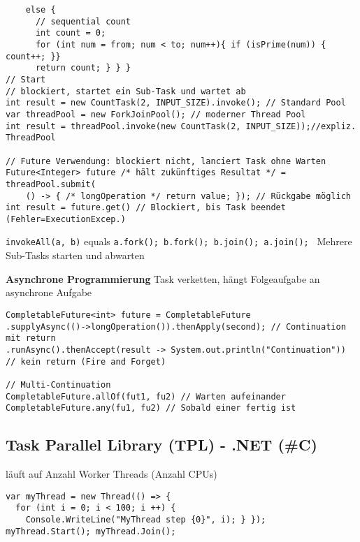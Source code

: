 \begin{lstlisting}
    else {
      // sequential count
      int count = 0;
      for (int num = from; num < to; num++){ if (isPrime(num)) { count++; }}
      return count; } } }
// Start
// blockiert, startet ein Sub-Task und wartet ab
int result = new CountTask(2, INPUT_SIZE).invoke(); // Standard Pool
var threadPool = new ForkJoinPool(); // moderner Thread Pool
int result = threadPool.invoke(new CountTask(2, INPUT_SIZE));//expliz. ThreadPool

// Future Verwendung: blockiert nicht, lanciert Task ohne Warten
Future<Integer> future /* hält zukünftiges Resultat */ = threadPool.submit(
    () -> { /* longOperation */ return value; }); // Rückgabe möglich
int result = future.get() // Blockiert, bis Task beendet (Fehler=ExecutionExcep.)
\end{lstlisting}

\lstinline{invokeAll(a, b)} equals \lstinline{a.fork(); b.fork(); b.join(); a.join(); } Mehrere Sub-Tasks starten und abwarten

\textbf{Asynchrone Programmierung}
Task verketten, hängt Folgeaufgabe an asynchrone Aufgabe
\begin{lstlisting}
CompletableFuture<int> future = CompletableFuture
.supplyAsync(()->longOperation()).thenApply(second); // Continuation mit return
.runAsync().thenAccept(result -> System.out.println("Continuation")) // kein return (Fire and Forget)

// Multi-Continuation
CompletableFuture.allOf(fut1, fu2) // Warten aufeinander
CompletableFuture.any(fu1, fu2) // Sobald einer fertig ist
\end{lstlisting}




\subsection{Task Parallel Library (TPL) - .NET (\#C)}
läuft auf Anzahl Worker Threads (Anzahl CPUs)

\begin{lstlisting}
var myThread = new Thread(() => {
  for (int i = 0; i < 100; i ++) {
    Console.WriteLine("MyThread step {0}", i); } });
myThread.Start(); myThread.Join();
\end{lstlisting}


